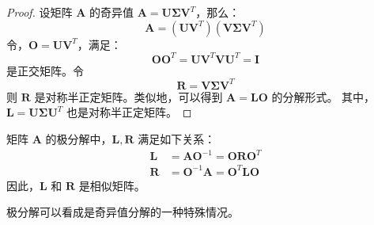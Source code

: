 \begin{proof}
    设矩阵 $\mathbf{A}$ 的奇异值 $\mathbf{A} = \mathbf{U} \boldsymbol{\Sigma} \mathbf{V}^T$，那么：
    \[
        \mathbf{A} = (\mathbf{U}\mathbf{V}^T) (\mathbf{V} \boldsymbol{\Sigma} \mathbf{V}^T)
    \]
    令，$\mathbf{O} = \mathbf{U}\mathbf{V}^T$，满足：
    \[
        \mathbf{O}\mathbf{O}^T = \mathbf{U}\mathbf{V}^T\mathbf{V}\mathbf{U}^T = \mathbf{I}
    \]
    是正交矩阵。令
    \[
        \mathbf{R} = \mathbf{V} \boldsymbol{\Sigma} \mathbf{V}^T
    \]
    则 $\mathbf{R}$ 是对称半正定矩阵。类似地，可以得到 $\mathbf{A} = \mathbf{L} \mathbf{O}$ 的分解形式。
    其中，$\mathbf{L} = \mathbf{U} \boldsymbol{\Sigma} \mathbf{U}^T$ 也是对称半正定矩阵。
\end{proof}

\begin{proposition}
    矩阵  $\mathbf{A}$ 的极分解中，$\mathbf{L}, \mathbf{R}$ 满足如下关系：
    \begin{align*}
        \mathbf{L} & = \mathbf{A}\mathbf{O}^{-1} = \mathbf{O} \mathbf{R} \mathbf{O}^T \\
        \mathbf{R} & = \mathbf{O}^{-1}\mathbf{A} = \mathbf{O}^T \mathbf{L} \mathbf{O}
    \end{align*}
    因此，$\mathbf{L}$ 和 $\mathbf{R}$ 是相似矩阵。
\end{proposition}

\begin{note}
    极分解可以看成是奇异值分解的一种特殊情况。
\end{note}

\newpage